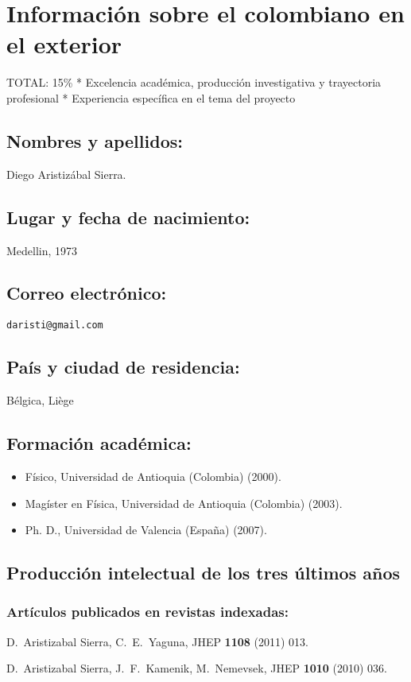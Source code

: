 \section{Información sobre el colombiano en el exterior}
\begin{evaluacion}
  TOTAL: 15\%
  * Excelencia académica, producción investigativa y trayectoria profesional
  * Experiencia específica en el tema del proyecto
\end{evaluacion}
\subsection{Nombres y apellidos:}
Diego Aristizábal Sierra.
\subsection{Lugar y fecha de nacimiento:}
Medellin, 1973
\subsection{Correo electrónico:}
\texttt{daristi@gmail.com}
\subsection{País y ciudad de residencia:}
Bélgica, Liège
\subsection{Formación académica:}
\begin{itemize}
\item Físico, Universidad de Antioquia (Colombia) (2000).
\item Magíster en Física, Universidad de Antioquia (Colombia) (2003).
\item Ph. D., Universidad de Valencia (España) (2007).
\end{itemize}
\subsection{Producción intelectual de los tres últimos años}
\subsubsection{Artículos publicados en revistas indexadas:}
  D.~Aristizabal Sierra, C.~E.~Yaguna,
  JHEP {\bf 1108 } (2011)  013.

  D.~Aristizabal Sierra, J.~F.~Kamenik, M.~Nemevsek,
  JHEP {\bf 1010 } (2010)  036.

